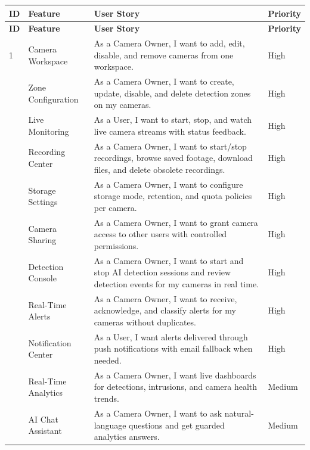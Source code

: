 \documentclass[12pt,a4paper,oneside]{report}
\newlength{\TblBacklogIdW}
\newlength{\TblBacklogFeatureW}
\newlength{\TblBacklogStoryW}
\newlength{\TblBacklogPrioW}
\begin{document}
\begin{longtable}{|>{\small\centering\arraybackslash}p{\TblBacklogIdW}|>{\small\raggedright\arraybackslash}p{\TblBacklogFeatureW}|>{\small\raggedright\arraybackslash}p{\TblBacklogStoryW}|>{\small\centering\arraybackslash}p{\TblBacklogPrioW}|}
\hline
\textbf{ID} & \textbf{Feature} & \textbf{User Story} & \textbf{Priority} \\
\hline
\endfirsthead
\hline \textbf{ID} & \textbf{Feature} & \textbf{User Story} & \textbf{Priority} \\ \hline
\endhead \hline
\endfoot \hline
\endlastfoot

1  & Camera Workspace & As a Camera Owner, I want to add, edit, disable, and remove cameras from one workspace. & High \\ \hline
2  & Zone Configuration & As a Camera Owner, I want to create, update, disable, and delete detection zones on my cameras. & High \\ \hline
3  & Live Monitoring & As a User, I want to start, stop, and watch live camera streams with status feedback. & High \\ \hline
4  & Recording Center & As a Camera Owner, I want to start/stop recordings, browse saved footage, download files, and delete obsolete recordings. & High \\ \hline
5  & Storage Settings & As a Camera Owner, I want to configure storage mode, retention, and quota policies per camera. & High \\ \hline
6  & Camera Sharing & As a Camera Owner, I want to grant camera access to other users with controlled permissions. & High \\ \hline
7  & Detection Console & As a Camera Owner, I want to start and stop AI detection sessions and review detection events for my cameras in real time. & High \\ \hline
8  & Real-Time Alerts & As a Camera Owner, I want to receive, acknowledge, and classify alerts for my cameras without duplicates. & High \\ \hline
9  & Notification Center & As a User, I want alerts delivered through push notifications with email fallback when needed. & High \\ \hline
10 & Real-Time Analytics & As a Camera Owner, I want live dashboards for detections, intrusions, and camera health trends. & Medium \\ \hline
11 & AI Chat Assistant & As a Camera Owner, I want to ask natural-language questions and get guarded analytics answers. & Medium \\ \hline

\end{longtable}
\end{document}
